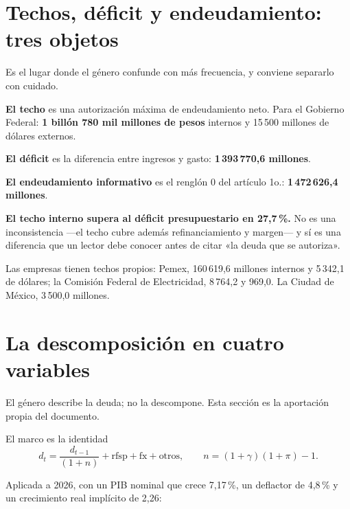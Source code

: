 \section{Techos, déficit y endeudamiento: tres objetos}



Es el lugar donde el género confunde con más frecuencia, y conviene separarlo con cuidado.

\begin{list}{}{\setlength{\leftmargin}{1.4em}\setlength{\itemsep}{2pt}}
\item[$\bullet$] \textbf{El techo} es una autorización máxima de endeudamiento neto. Para el
Gobierno Federal: \textbf{1 billón 780 mil millones de pesos} internos y 15\,500 millones de
dólares externos.
\item[$\bullet$] \textbf{El déficit} es la diferencia entre ingresos y gasto:
\textbf{1\,393\,770,6 millones}.
\item[$\bullet$] \textbf{El endeudamiento informativo} es el renglón 0 del artículo 1o.:
\textbf{1\,472\,626,4 millones}.
\end{list}

\textbf{El techo interno supera al déficit presupuestario en 27,7\,\%.} No es una
inconsistencia ---el techo cubre además refinanciamiento y margen--- y sí es una diferencia que
un lector debe conocer antes de citar «la deuda que se autoriza».

Las empresas tienen techos propios: Pemex, 160\,619,6 millones internos y 5\,342,1 de dólares;
la Comisión Federal de Electricidad, 8\,764,2 y 969,0. La Ciudad de México, 3\,500,0 millones.

\section{La descomposición en cuatro variables}



El género describe la deuda; no la descompone. Esta sección es la aportación propia del
documento.

El marco es la identidad
\[ d_t = \frac{d_{t-1}}{(1+n)} + \mathrm{rfsp} + \mathrm{fx} + \text{otros},
\qquad n = (1+\gamma)(1+\pi) - 1. \]

Aplicada a 2026, con un PIB nominal que crece 7,17\,\%, un deflactor de 4,8\,\% y un
crecimiento real implícito de 2,26:


